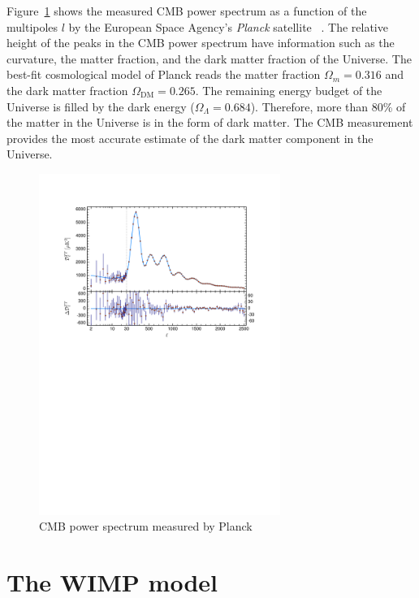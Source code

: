 \documentclass[doublespace,nopageskip]{VTthesis} %
\begin{document}
Figure~\ref{fig:cmb} shows the measured CMB power spectrum as a function of the multipoles $l$ by the European Space Agency's \emph{Planck} satellite  ~\cite{2020A&A...641A...6P}. The relative height of the peaks in the CMB power spectrum have information such as the curvature, the matter fraction, and the dark matter fraction of the Universe. The best-fit cosmological model of Planck reads the matter fraction $\Omega_m = 0.316$ and the dark matter fraction $\Omega_\mathrm{DM} = 0.265$. The remaining energy budget of the Universe is filled by the dark energy ($\Omega_\Lambda = 0.684$). Therefore, more than 80\% of the matter in the Universe is in the form of dark matter. The CMB measurement provides the most accurate estimate of the dark matter component in the Universe.
\begin{figure}[hbt]
    \centering
    \includegraphics[width=0.7\textwidth]{Figures/Intro/Planck_CMB.pdf}
    \caption{CMB power spectrum measured by Planck~\cite{2020A&A...641A...6P}}
    \label{fig:cmb}
\end{figure}

\section{The WIMP model}
\end{document}
